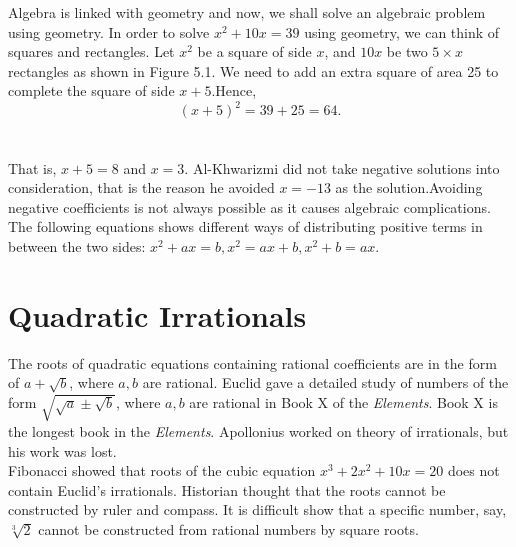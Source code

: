 \documentclass[a4paper,reqno,11pt]{book}
\theoremstyle{plain}%
\theoremstyle{definition}
\begin{document}
\indent Algebra is linked with geometry and now, we shall solve an algebraic problem using geometry. In order to solve $x^2 + 10x = 39$ using geometry, we can think of squares and rectangles. Let $x^2$ be a square of side $x$, and $10x$ be two $5 \times x$ rectangles as shown in Figure 5.1. We need to add an extra square of area 25 to complete the square of side $x + 5$.Hence,
$$(x + 5)^2 =39 + 25 =64.$$
\\
\\
That is, $x+5 = 8$ and $x = 3.$ Al-Khwarizmi did not take negative solutions into consideration, that is the reason he avoided $x = -13$ as the solution.Avoiding negative coefficients is not always possible as it causes algebraic complications. The following equations shows different ways of distributing positive terms in between the two sides: $x^2 + ax = b, x^2 = ax + b,
x^2 + b = ax.$\\
\section{Quadratic Irrationals}
The roots of quadratic equations containing rational coefficients are in the form of $a + \sqrt{b}$, where $a, b$ are rational. Euclid gave a detailed study of numbers of the form $\sqrt{\sqrt{a}\pm\sqrt{b}}$, where $a,b$ are rational in Book X of the \textit{Elements}. Book X is
the longest book in the \textit{Elements}. Apollonius worked on theory of irrationals, but his work was lost.\\
\indent Fibonacci showed that roots of the cubic equation $x^3 + 2x^2 + 10x = 20$ does not contain Euclid’s irrationals. Historian thought that the roots cannot be constructed by ruler and compass. It is difficult show that a specific number, say, $\sqrt[3]{2}$ cannot be constructed from rational numbers by square roots.\\
\\
\end{document}
